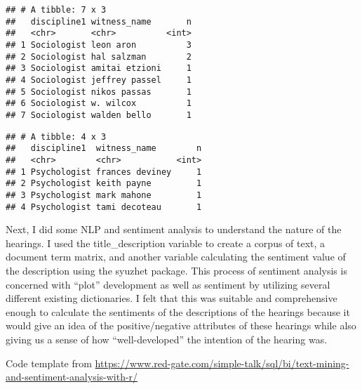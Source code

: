 \documentclass[]{article}
\newenvironment{Shaded}{\begin{snugshade}}{\end{snugshade}}
\newcommand{\KeywordTok}[1]{\textcolor[rgb]{0.13,0.29,0.53}{\textbf{#1}}}
\newcommand{\NormalTok}[1]{#1}
\newcommand{\OperatorTok}[1]{\textcolor[rgb]{0.81,0.36,0.00}{\textbf{#1}}}
\newcommand{\StringTok}[1]{\textcolor[rgb]{0.31,0.60,0.02}{#1}}
\begin{document}
\begin{verbatim}
## # A tibble: 7 x 3
##   discipline1 witness_name       n
##   <chr>       <chr>          <int>
## 1 Sociologist leon aron          3
## 2 Sociologist hal salzman        2
## 3 Sociologist amitai etzioni     1
## 4 Sociologist jeffrey passel     1
## 5 Sociologist nikos passas       1
## 6 Sociologist w. wilcox          1
## 7 Sociologist walden bello       1
\end{verbatim}

\begin{Shaded}
\end{Shaded}

\begin{verbatim}
## # A tibble: 4 x 3
##   discipline1  witness_name        n
##   <chr>        <chr>           <int>
## 1 Psychologist frances deviney     1
## 2 Psychologist keith payne         1
## 3 Psychologist mark mahone         1
## 4 Psychologist tami decoteau       1
\end{verbatim}

Next, I did some NLP and sentiment analysis to understand the nature of
the hearings. I used the title\_description variable to create a corpus
of text, a document term matrix, and another variable calculating the
sentiment value of the description using the syuzhet package. This
process of sentiment analysis is concerned with ``plot'' development as
well as sentiment by utilizing several different existing dictionaries.
I felt that this was suitable and comprehensive enough to calculate the
sentiments of the descriptions of the hearings because it would give an
idea of the positive/negative attributes of these hearings while also
giving us a sense of how ``well-developed'' the intention of the hearing
was.

Code template from
\url{https://www.red-gate.com/simple-talk/sql/bi/text-mining-and-sentiment-analysis-with-r/}
\end{document}
